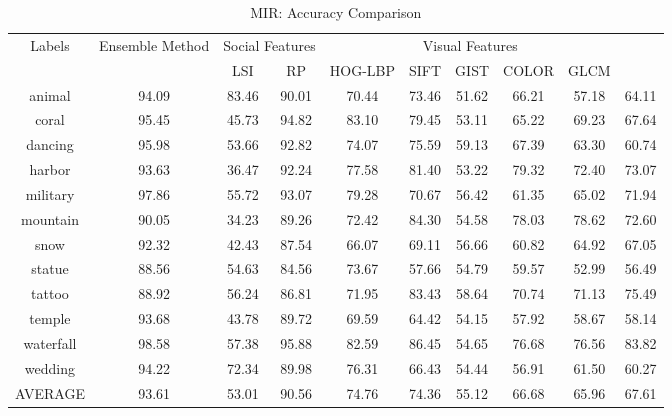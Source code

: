 \begin{sidewaystable}
\caption{ MIR: Accuracy Comparison} %
\vspace*{0.2 cm}
\begin{tabular}{|c|c|c|c|c|c|c|c|c|c|} \\ \hline  %
Labels  & Ensemble Method  &\multicolumn{2}{c}{Social Features}  &\multicolumn{5}{c}{Visual Features}\\ [0.5ex]
 &  & LSI & RP & HOG-LBP & SIFT & GIST & COLOR & GLCM \\  [1ex] \hline

animal & 94.09 & 83.46 & 90.01 & 70.44 & 73.46 & 51.62 & 66.21 & 57.18 & 64.11 \\  [1ex]
coral & 95.45 & 45.73 & 94.82 & 83.10 & 79.45 & 53.11 & 65.22 & 69.23 & 67.64 \\  [1ex]
dancing & 95.98 & 53.66 & 92.82 & 74.07 & 75.59 & 59.13 & 67.39 & 63.30 & 60.74 \\  [1ex]
harbor & 93.63 & 36.47 & 92.24 & 77.58 & 81.40 & 53.22 & 79.32 & 72.40 & 73.07 \\  [1ex]
military & 97.86 & 55.72 & 93.07 & 79.28 & 70.67 & 56.42 & 61.35 & 65.02 & 71.94 \\  [1ex]
mountain & 90.05 & 34.23 & 89.26 & 72.42 & 84.30 & 54.58 & 78.03 & 78.62 & 72.60 \\  [1ex]
snow & 92.32 & 42.43 & 87.54 & 66.07 & 69.11 & 56.66 & 60.82 & 64.92 & 67.05 \\  [1ex]
statue & 88.56 & 54.63 & 84.56 & 73.67 & 57.66 & 54.79 & 59.57 & 52.99 & 56.49 \\  [1ex]
tattoo & 88.92 & 56.24 & 86.81 & 71.95 & 83.43 & 58.64 & 70.74 & 71.13 & 75.49 \\  [1ex]
temple & 93.68 & 43.78 & 89.72 & 69.59 & 64.42 & 54.15 & 57.92 & 58.67 & 58.14 \\  [1ex]
waterfall & 98.58 & 57.38 & 95.88 & 82.59 & 86.45 & 54.65 & 76.68 & 76.56 & 83.82 \\  [1ex]
wedding & 94.22 & 72.34 & 89.98 & 76.31 & 66.43 & 54.44 & 56.91 & 61.50 & 60.27 \\  [1ex] \hline
AVERAGE & 93.61 & 53.01 & 90.56 & 74.76 & 74.36 & 55.12 & 66.68 & 65.96 & 67.61 \\  [1ex] \hline

\end{tabular}
\label{table:MIRAccuracy} %
\end{sidewaystable}



